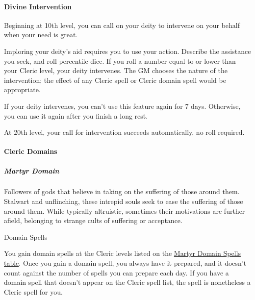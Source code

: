 \paragraph{Divine
Intervention}\label{cleric-feature-divine-intervention}

Beginning at 10th level, you can call on your deity to intervene on your
behalf when your need is great.

Imploring your deity's aid requires you to use your action. Describe the
assistance you seek, and roll percentile dice. If you roll a number
equal to or lower than your Cleric level, your deity intervenes. The GM
chooses the nature of the intervention; the effect of any Cleric spell
or Cleric domain spell would be appropriate.

If your deity intervenes, you can't use this feature again for 7 days.
Otherwise, you can use it again after you finish a long rest.

At 20th level, your call for intervention succeeds automatically, no
roll required.

\paragraph{Cleric Domains}\label{cleric-subclasses}

\subparagraph{Martyr Domain}\label{_martyr_domain}

Followers of gods that believe in taking on the suffering of those
around them. Stalwart and unflinching, these intrepid souls seek to ease
the suffering of those around them. While typically altruistic,
sometimes their motivations are further afield, belonging to strange
cults of suffering or acceptance.

Domain Spells

You gain domain spells at the Cleric levels listed on the
\hyperref[cleric-domain-martry-spells-table]{Martyr Domain Spells
table}. Once you gain a domain spell, you always have it prepared, and
it doesn't count against the number of spells you can prepare each day.
If you have a domain spell that doesn't appear on the Cleric spell list,
the spell is nonetheless a Cleric spell for you.

